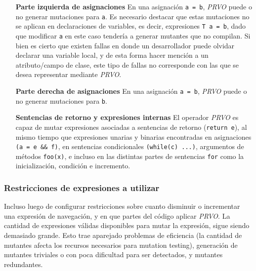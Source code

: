 \begin{enumerate}[leftmargin=.75cm,align=left]
	\item[\textbf{Parte izquierda de asignaciones}] En una asignaci\'on \texttt{a = b}, \emph{PRVO} puede o no generar mutaciones para \texttt{a}. Es necesario destacar que estas mutaciones no se aplican en declaraciones de variables, es decir, expresiones \texttt{T a = b}, dado que modificar \texttt{a} en este caso tender\'ia a generar mutantes que no compilan. Si bien es cierto que existen fallas en donde un desarrollador puede olvidar declarar una variable local, y de esta forma hacer menci\'on a un atributo/campo de clase, este tipo de fallas no corresponde con las que se desea representar mediante \emph{PRVO}.
	
	\item[\textbf{Parte derecha de asignaciones}] En una asignaci\'on \texttt{a = b}, \emph{PRVO} puede o no generar mutaciones para \texttt{b}.
	
	\item[\textbf{Sentencias de retorno y expresiones internas}] El operador \emph{PRVO} es capaz de mutar expresiones asociadas a sentencias de retorno (\texttt{return e}), al mismo tiempo que expresiones unarias y binarias encontradas en asignaciones \texttt{(a = e \&\& f)}, en sentencias condicionales \texttt{(while(c) ...)}, argumentos de m\'etodos \texttt{foo(x)}, e incluso en las distintas partes de sentencias \texttt{for} como la inicializaci\'on, condici\'on e incremento.
\end{enumerate}

\subsubsection{Restricciones de expresiones a utilizar}

Incluso luego de configurar restricciones sobre cuanto disminuir o incrementar una expresi\'on de navegaci\'on, y en que partes del c\'odigo aplicar \emph{PRVO}. La cantidad de expresiones v\'alidas disponibles para mutar la expresi\'on, sigue siendo demasiado grande. Esto trae aparejado problemas de eficiencia (la cantidad de mutantes afecta los recursos necesarios para mutation testing), generaci\'on de mutantes triviales o con poca dificultad para ser detectados, y mutantes redundantes.

